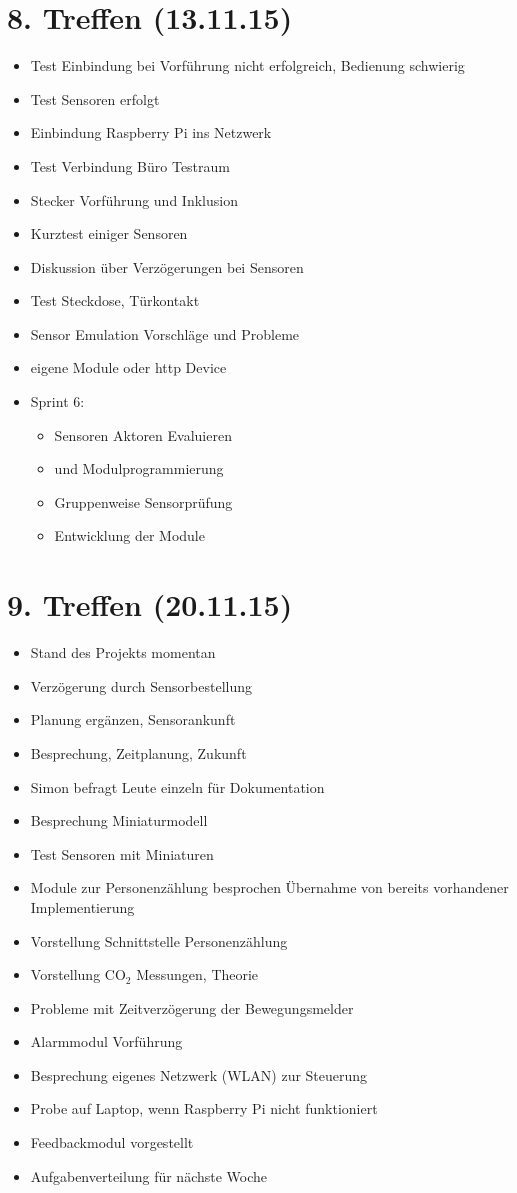 \section{8. Treffen (13.11.15)}
\begin{itemize}
	\item Test Einbindung bei Vorführung nicht erfolgreich, Bedienung schwierig
	\item Test Sensoren erfolgt
	\item Einbindung Raspberry Pi ins Netzwerk
	\item Test Verbindung Büro Testraum
	\item Stecker Vorführung und Inklusion
	\item Kurztest einiger Sensoren
	\item Diskussion über Verzögerungen bei Sensoren
	\item Test Steckdose, Türkontakt
	\item Sensor Emulation Vorschläge und Probleme
	\item eigene Module oder http Device
	\item Sprint 6:
	\begin{itemize}
			\item Sensoren Aktoren Evaluieren
			\item und Modulprogrammierung
			\item Gruppenweise Sensorprüfung
			\item Entwicklung der Module
	\end{itemize}	
\end{itemize}

\section{9. Treffen (20.11.15)}
\begin{itemize}
	\item Stand des Projekts momentan
	\item Verzögerung durch Sensorbestellung
	\item Planung ergänzen, Sensorankunft
	\item Besprechung, Zeitplanung, Zukunft
	\item Simon befragt Leute einzeln für Dokumentation
	\item Besprechung Miniaturmodell
	\item Test Sensoren mit Miniaturen
	\item Module zur Personenzählung besprochen Übernahme von bereits vorhandener Implementierung
	\item Vorstellung Schnittstelle Personenzählung
	\item Vorstellung CO$_2$ Messungen, Theorie
	\item Probleme mit Zeitverzögerung der Bewegungsmelder
	\item Alarmmodul Vorführung
	\item Besprechung eigenes Netzwerk (WLAN) zur Steuerung
	\item Probe auf Laptop, wenn Raspberry Pi nicht funktioniert
	\item Feedbackmodul vorgestellt
	\item Aufgabenverteilung für nächste Woche
\end{itemize}

